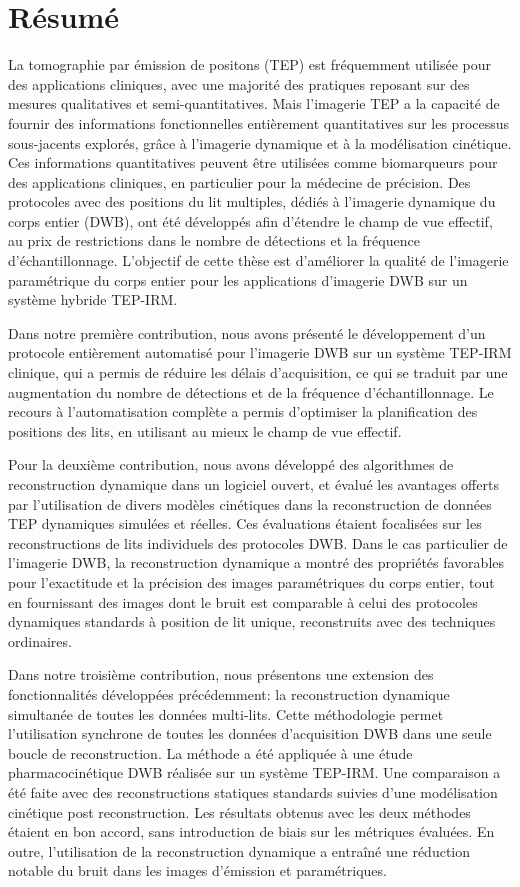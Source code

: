 \section*{Résumé}
La tomographie par émission de positons (TEP) est fréquemment utilisée pour des applications cliniques, avec une majorité des pratiques reposant sur des mesures qualitatives et semi-quantitatives. Mais l'imagerie TEP a la capacité de fournir des informations fonctionnelles entièrement quantitatives sur les processus sous-jacents explorés, grâce à l'imagerie dynamique et à la modélisation cinétique. Ces informations quantitatives peuvent être utilisées comme biomarqueurs pour des applications cliniques, en particulier pour la médecine de précision. Des protocoles avec des positions du lit multiples, dédiés à l'imagerie dynamique du corps entier (DWB), ont été développés afin d'étendre le champ de vue effectif, au prix de restrictions dans le nombre de détections et la fréquence d'échantillonnage. L'objectif de cette thèse est d'améliorer la qualité de l'imagerie paramétrique du corps entier pour les applications d'imagerie DWB sur un système hybride TEP-IRM.

Dans notre première contribution, nous avons présenté le développement d'un protocole entièrement automatisé pour l'imagerie DWB sur un système TEP-IRM clinique, qui a permis de réduire les délais d'acquisition, ce qui se traduit par une augmentation du nombre de détections et de la fréquence d'échantillonnage. Le recours à l'automatisation complète a permis d'optimiser la planification des positions des lits, en utilisant au mieux le champ de vue effectif. 

Pour la deuxième contribution, nous avons développé des algorithmes de reconstruction dynamique dans un logiciel ouvert, et évalué les avantages offerts par l'utilisation de divers modèles cinétiques dans la reconstruction de données TEP dynamiques simulées et réelles. Ces évaluations étaient focalisées sur les reconstructions de lits individuels des protocoles DWB. Dans le cas particulier de l'imagerie DWB, la reconstruction dynamique a montré des propriétés favorables pour l'exactitude et la précision des images paramétriques du corps entier, tout en fournissant des images dont le bruit est comparable à celui des protocoles dynamiques standards à position de lit unique, reconstruits avec des techniques ordinaires.

Dans notre troisième contribution, nous présentons une extension des fonctionnalités développées précédemment: la reconstruction dynamique simultanée de toutes les données multi-lits. Cette méthodologie permet l'utilisation synchrone de toutes les données d'acquisition DWB dans une seule boucle de reconstruction. La méthode a été appliquée à une étude pharmacocinétique DWB réalisée sur un système TEP-IRM. Une comparaison a été faite avec des reconstructions statiques standards suivies d'une modélisation cinétique post reconstruction. Les résultats obtenus avec les deux méthodes étaient en bon accord, sans introduction de biais sur les métriques évaluées. En outre, l'utilisation de la reconstruction dynamique a entraîné une réduction notable du bruit dans les images d’émission et paramétriques. 

